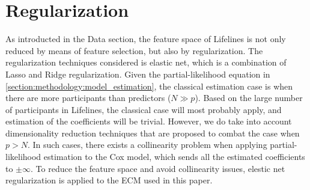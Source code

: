 


\section{Regularization}
\label{section:methodology:regularization}
As introducted in the Data section, the feature space of Lifelines is not only reduced by means of feature selection, but also by regularization. The regularization techniques considered is elastic net, which is a combination of Lasso and Ridge regularization. Given the partial-likelihood equation in \ref{section:methodology:model_estimation}, the classical estimation case is when there are more participants than predictors ($N \gg p$). Based on the large number of participants in Lifelines, the classical case will most probably apply, and estimation of the coefficients will be trivial. However, we do take into account dimensionality reduction techniques that are proposed to combat the case when $p > N$. In such cases, there exists a collinearity problem when applying partial-likelihood estimation to the Cox model, which sends all the estimated coefficients to $ \pm \infty$. To reduce the feature space and avoid collinearity issues, elestic net regularization is applied to the ECM used in this paper. 

